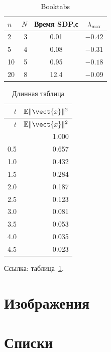 \documentclass[font=modern]{cmcmsuthesis-doctoral}
\begin{document}
\begin{table}[htbp]\caption{Booktabs}\label{tab:booktabs}\centering
\begin{tabular}{lrcc}\toprule
\textbf{$n$}&\textbf{$N$}&\textbf{Время SDP,с}&\textbf{$\lambda_{\max}$}\\\midrule
2&3&0.01&$-0.42$\\5&4&0.08&$-0.31$\\10&5&0.95&$-0.18$\\20&8&12.4&$-0.09$\\\bottomrule
\end{tabular}\end{table}

\begin{longtable}{@{}rr@{}}\caption{Длинная таблица}\label{tab:long}\\
\toprule $t$&$\mathbb{E}\|\vect{x}\|^2$\\\midrule\endfirsthead
\toprule $t$&$\mathbb{E}\|\vect{x}\|^2$\\\midrule\endhead\bottomrule\endfoot
0.0&1.000\\0.5&0.657\\1.0&0.432\\1.5&0.284\\2.0&0.187\\
2.5&0.123\\3.0&0.081\\3.5&0.053\\4.0&0.035\\4.5&0.023\\\end{longtable}
Ссылка: таблица~\ref{tab:booktabs}.

\section{Изображения}

\section{Списки}
\end{document}
